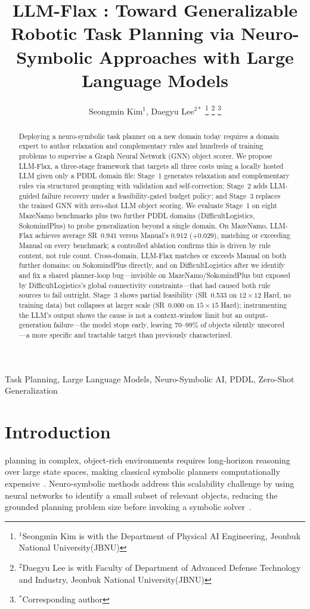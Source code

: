 \documentclass[letterpaper, 10pt, journal, twoside]{IEEEtran}
\title{\LARGE \bf
LLM-Flax : Toward Generalizable Robotic Task Planning via Neuro-Symbolic Approaches with Large Language Models
}
\author{Seongmin Kim$^{1}$, Daegyu Lee$^{2*}$%
\thanks{$^{1}$Seongmin Kim is with the Department of Physical AI Engineering, Jeonbuk National University(JBNU)}
\thanks{$^{2}$Daegyu Lee is with Faculty of Department of Advanced Defense Technology and Industry, Jeonbuk National University(JBNU)}
\thanks{$^{*}$Corresponding author}
}
\newcommand{\method}{LLM-Flax\xspace}
\begin{document}
\maketitle

\begin{abstract}
Deploying a neuro-symbolic task planner on a new domain today requires a domain expert to author relaxation and complementary rules and hundreds of training problems to supervise a Graph Neural Network (GNN) object scorer.
We propose \method, a three-stage framework that targets all three costs using a locally hosted LLM given only a PDDL domain file: Stage~1 generates relaxation and complementary rules via structured prompting with validation and self-correction; Stage~2 adds LLM-guided failure recovery under a feasibility-gated budget policy; and Stage~3 replaces the trained GNN with zero-shot LLM object scoring.
We evaluate Stage~1 on eight MazeNamo benchmarks plus two further PDDL domains (DifficultLogistics, SokomindPlus) to probe generalization beyond a single domain.
On MazeNamo, \method achieves average SR~0.941 versus Manual's 0.912 ($+0.029$), matching or exceeding Manual on every benchmark; a controlled ablation confirms this is driven by rule content, not rule count.
Cross-domain, \method matches or exceeds Manual on both further domains: on SokomindPlus directly, and on DifficultLogistics after we identify and fix a shared planner-loop bug---invisible on MazeNamo/SokomindPlus but exposed by DifficultLogistics's global connectivity constraints---that had caused both rule sources to fail outright.
Stage~3 shows partial feasibility (SR~0.533 on $12{\times}12$ Hard, no training data) but collapses at larger scale (SR~0.000 on $15{\times}15$ Hard); instrumenting the LLM's output shows the cause is not a context-window limit but an output-generation failure---the model stops early, leaving 70--99\% of objects silently unscored---a more specific and tractable target than previously characterized.
\end{abstract}

\begin{IEEEkeywords}
Task Planning, Large Language Models, Neuro-Symbolic AI, PDDL, Zero-Shot Generalization
\end{IEEEkeywords}

\section{Introduction}
 planning in complex, object-rich environments requires long-horizon reasoning over large state spaces, making classical symbolic planners computationally expensive~\cite{helmert2006fast,edelkamp2004pddl2}.
Neuro-symbolic methods address this scalability challenge by using neural networks to identify a small subset of relevant objects, reducing the grounded planning problem size before invoking a symbolic solver~\cite{silver2021planning,chen2024graph}.
\end{document}
